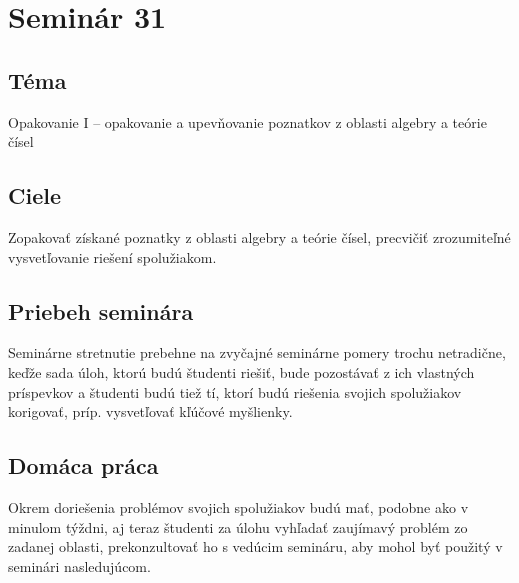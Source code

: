 \section*{Seminár 31}
\subsection*{Téma}
Opakovanie I -- opakovanie a upevňovanie poznatkov z oblasti algebry a teórie čísel
\subsection*{Ciele}
Zopakovať získané poznatky z oblasti algebry a teórie čísel, precvičiť zrozumiteľné vysvetľovanie riešení spolužiakom.

\subsection*{Priebeh seminára}
Seminárne stretnutie prebehne na zvyčajné seminárne pomery trochu netradične, keďže sada úloh, ktorú budú študenti riešiť, bude pozostávať z ich vlastných príspevkov a študenti budú tiež tí, ktorí budú riešenia svojich spolužiakov korigovať, príp. vysvetľovať kľúčové myšlienky.

\subsection*{Domáca práca}
Okrem doriešenia problémov svojich spolužiakov budú mať, podobne ako v minulom týždni, aj teraz študenti za úlohu vyhľadať zaujímavý problém zo zadanej oblasti, prekonzultovať ho s vedúcim semináru, aby mohol byť použitý v seminári nasledujúcom.
